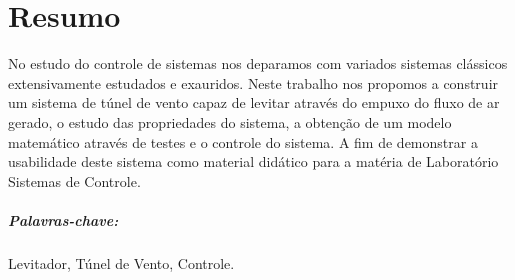 \chapter*{Resumo}
\thispagestyle{empty}

No estudo do controle de sistemas nos deparamos com variados sistemas clássicos extensivamente estudados e exauridos. Neste trabalho nos propomos a construir um sistema de túnel de vento capaz de levitar através do empuxo do fluxo de ar gerado, o estudo das propriedades do sistema, a obtenção de um modelo matemático através de testes e o controle do sistema. A fim de demonstrar a usabilidade deste sistema como material didático para a matéria de Laboratório Sistemas de Controle.

\vspace{50pt}

\paragraph{Palavras-chave:} Levitador, Túnel de Vento, Controle.

